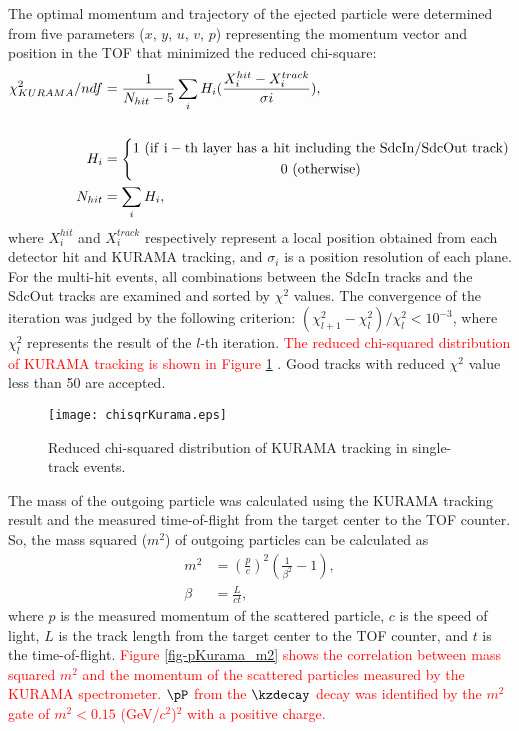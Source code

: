 The optimal momentum and trajectory of the ejected particle were determined from five parameters ($x$, $y$, $u$, $v$, $p$) representing the momentum vector and position in the TOF that minimized the reduced chi-square:
\begin{align}
  \chi^{2}_{KURAMA}/ndf &= \frac{1}{N_{hit}-5}\sum_{i}H_{i}(\frac{X^{hit}_{i} - X^{track}_{i}}{\sigma{i}}), \\
    \nonumber \\
  H_i &= \left\{ 
    \begin{gathered}
  	1\ ({\rm if\ i-th\ layer\ has\ a\ hit\ including\ the\ SdcIn/SdcOut\ track}) \\ 
	0\ ({\rm otherwise}) 
    \end{gathered}
    \right. \nonumber \\
  N_{hit} &= \sum_{i}H_{i}, \nonumber 
\end{align}
where $X^{hit}_{i}$ and $X^{track}_{i}$ respectively represent a local position obtained from each detector hit and KURAMA tracking, and $\sigma_{i}$ is a position resolution of each plane. For the multi-hit events, all combinations between the SdcIn tracks and the SdcOut tracks are examined and sorted by $\chi^{2}$ values. The convergence of the iteration was judged by the following criterion: $(\chi^{2}_{l+1} - \chi^{2}_{l})/\chi^{2}_{l} < 10^{-3}$, where $\chi^{2}_{l}$ represents the result of the $l$-th iteration. \textcolor{red}{ The reduced chi-squared distribution of KURAMA tracking is shown in Figure \ref{fig-chisqrKurama} }. Good tracks with reduced $\chi^{2}$ value less than 50 are accepted.

\begin{figure}[!h]
  \begin{center}
    \texttt{[image: chisqrKurama.eps]}
    \caption{Reduced chi-squared distribution of KURAMA tracking in single-track events.}
    \label{fig-chisqrKurama}
  \end{center}
\end{figure}

The mass of the outgoing particle was calculated using the KURAMA tracking result and the measured time-of-flight from the target center to the TOF counter. So, the mass squared ($m^{2}$) of outgoing particles can be calculated as
\begin{align}
  m^2 &= \left( \frac{p}{c} \right)^{2} \left( \frac{1}{\beta^{2}} - 1\right), \\
  \beta &= \frac{L}{ct},
\end{align}
where 
$p$ is the measured momentum of the scattered particle, $c$ is the speed of light, $L$ is the track length from the target center to the TOF counter, and $t$ is the time-of-flight. \textcolor{red}{ Figure \ref{fig-pKurama_m2} shows the correlation between mass squared $m^{2}$ and the momentum of the scattered particles measured by the KURAMA spectrometer. $\pP$ from the $\kzdecay$ decay was identified by the $m^{2}$ gate of $m^{2}<0.15$ (GeV/$c^{2}$)$^{2}$ with a positive charge. }


